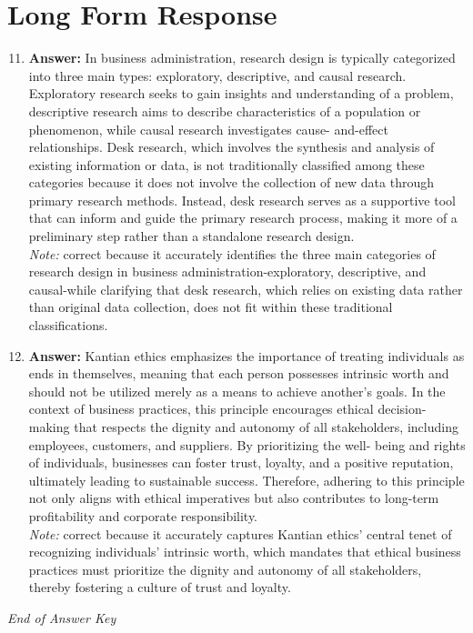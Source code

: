 \documentclass[12pt]{article}
\begin{document}
\section*{Long Form Response}
\begin{enumerate}[label=\arabic*.]
\setcounter{enumi}{10}
\item \textbf{Answer:} In business administration, research design is typically categorized into three main types: exploratory, descriptive, and causal research. Exploratory research seeks to gain insights and understanding of a problem, descriptive research aims to describe characteristics of a population or phenomenon, while causal research investigates cause- and-effect relationships. Desk research, which involves the synthesis and analysis of existing information or data, is not traditionally classified among these categories because it does not involve the collection of new data through primary research methods. Instead, desk research serves as a supportive tool that can inform and guide the primary research process, making it more of a preliminary step rather than a standalone research design.
\\ \textit{Note:} correct because it accurately identifies the three main categories of research design in business administration-exploratory, descriptive, and causal-while clarifying that desk research, which relies on existing data rather than original data collection, does not fit within these traditional classifications.
\item \textbf{Answer:} Kantian ethics emphasizes the importance of treating individuals as ends in themselves, meaning that each person possesses intrinsic worth and should not be utilized merely as a means to achieve another's goals. In the context of business practices, this principle encourages ethical decision-making that respects the dignity and autonomy of all stakeholders, including employees, customers, and suppliers. By prioritizing the well- being and rights of individuals, businesses can foster trust, loyalty, and a positive reputation, ultimately leading to sustainable success. Therefore, adhering to this principle not only aligns with ethical imperatives but also contributes to long-term profitability and corporate responsibility.
\\ \textit{Note:} correct because it accurately captures Kantian ethics' central tenet of recognizing individuals' intrinsic worth, which mandates that ethical business practices must prioritize the dignity and autonomy of all stakeholders, thereby fostering a culture of trust and loyalty.
\end{enumerate}

\vfill
\noindent\textit{End of Answer Key}
\end{document}
